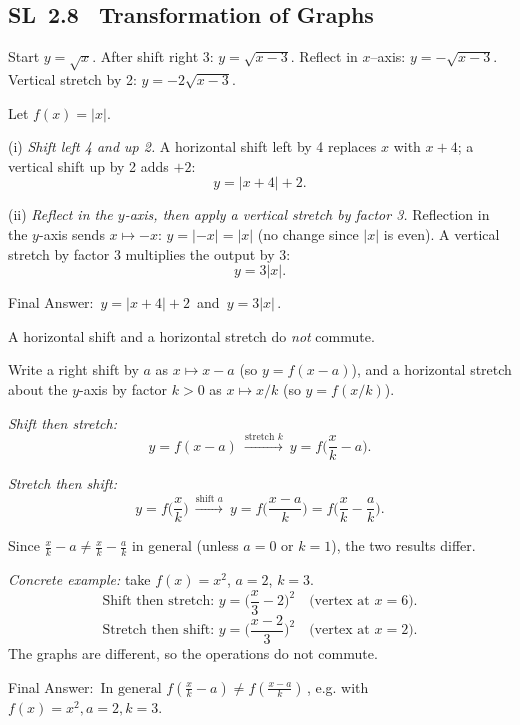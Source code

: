 \documentclass[11pt]{article}
\def\textbf#1{#1}%
\newcommand{\tocsubsection}[1]{\subsection{#1}}
\begin{document}
\tocsubsection{SL 2.8 \; Transformation of Graphs}


\begin{solution}
Start $y=\sqrt{x}$. After shift right 3: $y=\sqrt{x-3}$.
Reflect in $x$–axis: $y=-\sqrt{x-3}$. Vertical stretch by 2: $y=-2\sqrt{x-3}$.
\end{solution}

\begin{solution}
Let \(f(x)=|x|\).

(i) \emph{Shift left 4 and up 2.}  
A horizontal shift left by 4 replaces \(x\) with \(x+4\); a vertical shift up by 2 adds \(+2\):
\[
y=|x+4|+2.
\]

(ii) \emph{Reflect in the \(y\)-axis, then apply a vertical stretch by factor 3.}  
Reflection in the \(y\)-axis sends \(x\mapsto -x\): \(y=|-x|=|x|\) (no change since \(|x|\) is even).  
A vertical stretch by factor \(3\) multiplies the output by \(3\):
\[
y=3|x|.
\]

\textbf{Final Answer:} \(\boxed{\,y=|x+4|+2\,}\) and \(\boxed{\,y=3|x|\,}\).
\end{solution}

\begin{solution}
A horizontal shift and a horizontal stretch do \emph{not} commute.

Write a right shift by \(a\) as \(x\mapsto x-a\) (so \(y=f(x-a)\)), and a horizontal stretch about the \(y\)-axis by factor \(k>0\) as \(x\mapsto x/k\) (so \(y=f(x/k)\)).

\emph{Shift then stretch:}
\[
y=f(x-a)\ \xrightarrow{\text{stretch }k}\ y=f\Big(\frac{x}{k}-a\Big).
\]

\emph{Stretch then shift:}
\[
y=f\Big(\frac{x}{k}\Big)\ \xrightarrow{\text{shift }a}\ y=f\Big(\frac{x-a}{k}\Big)=f\Big(\frac{x}{k}-\frac{a}{k}\Big).
\]

Since \(\frac{x}{k}-a\neq \frac{x}{k}-\frac{a}{k}\) in general (unless \(a=0\) or \(k=1\)), the two results differ.

\emph{Concrete example:} take \(f(x)=x^2\), \(a=2\), \(k=3\).
\[
\text{Shift then stretch: } y=\Big(\frac{x}{3}-2\Big)^2 \quad\text{(vertex at }x=6\text{)}.
\]
\[
\text{Stretch then shift: } y=\Big(\frac{x-2}{3}\Big)^2 \quad\text{(vertex at }x=2\text{)}.
\]
The graphs are different, so the operations do not commute.

\textbf{Final Answer:} \(\boxed{\,\text{In general } f(\tfrac{x}{k}-a)\neq f(\tfrac{x-a}{k})\,}\), e.g. with \(f(x)=x^2,a=2,k=3\).
\end{solution}
\end{document}
